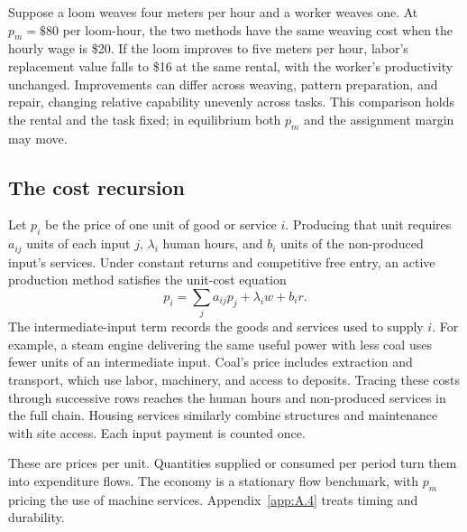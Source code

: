 \documentclass[12pt]{article}
\theoremstyle{plain}
\begin{document}
Suppose a loom weaves four meters per hour and a worker weaves one. At $p_m=\$80$ per loom-hour, the two methods have the same weaving cost when the hourly wage is \$20. If the loom improves to five meters per hour, labor's replacement value falls to \$16 at the same rental, with the worker's productivity unchanged. Improvements can differ across weaving, pattern preparation, and repair, changing relative capability unevenly across tasks. This comparison holds the rental and the task fixed; in equilibrium both $p_m$ and the assignment margin may move.

\subsection{The cost recursion}\label{sec:3.2}

Let $p_i$ be the price of one unit of good or service $i$. Producing that unit requires $a_{ij}$ units of each input $j$, $\lambda_i$ human hours, and $b_i$ units of the non-produced input's services. Under constant returns and competitive free entry, an active production method satisfies the unit-cost equation
\begin{equation}\label{eq:2}
p_i = \sum_j a_{ij}p_j + \lambda_i w + b_i r.
\end{equation}
The intermediate-input term records the goods and services used to supply $i$. For example, a steam engine delivering the same useful power with less coal uses fewer units of an intermediate input. Coal's price includes extraction and transport, which use labor, machinery, and access to deposits. Tracing these costs through successive rows reaches the human hours and non-produced services in the full chain. Housing services similarly combine structures and maintenance with site access. Each input payment is counted once.

These are prices per unit. Quantities supplied or consumed per period turn them into expenditure flows. The economy is a stationary flow benchmark, with $p_m$ pricing the use of machine services. Appendix~\ref{app:A.4} treats timing and durability.
\end{document}
